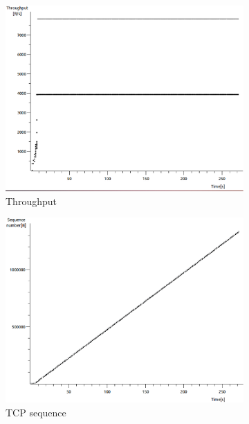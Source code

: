 \documentclass[conference,a4paper]{../../sty/IEEEtran}
\begin{document}
\begin{figure}
 \centering
 \begin{subfigure}[b]{0.2\textwidth}
  \includegraphics[width=\textwidth]{s1-3_thru}
  \caption{Throughput}
 \end{subfigure}
 \begin{subfigure}[b]{0.2\textwidth}
  \includegraphics[width=\textwidth]{s1-3_seq}
  \caption{TCP sequence}
 \end{subfigure}
 \begin{subfigure}[b]{0.2\textwidth}

\end{subfigure}
\end{figure}
\end{document}
